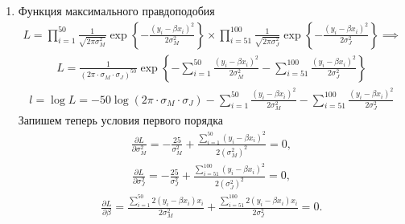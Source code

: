 \documentclass[12pt, a4paper]{article}\usepackage[]{graphicx}\usepackage[]{color}
\begin{document}
\begin{enumerate}
\item
Функция максимального правдоподобия
\begin{eqnarray}
L = \prod_{i=1}^{50} \frac 1 {\sqrt{2\pi \sigma_M^2}} \exp\left\{-\frac{(y_i - \beta x_i)^2}{2\sigma^2_M}\right\} \times \prod_{i=51}^{100} \frac 1 {\sqrt{2\pi \sigma_J^2}} \exp\left\{-\frac{(y_i - \beta x_i)^2}{2\sigma^2_J}\right\} \implies
\end{eqnarray}
\begin{eqnarray}
L = \frac{1}{(2\pi\cdot \sigma_M\cdot \sigma_J)^{50}} \exp\left\{-\sum_{i=1}^{50} \frac{(y_i - \beta x_i)^2}{2\sigma_M^2} - \sum_{i=51}^{100} \frac{(y_i - \beta x_i)^2}{2\sigma_J^2}\right\}
\end{eqnarray}
\begin{eqnarray}
l = \log L = -50 \log(2\pi \cdot \sigma_M \cdot \sigma_J) -\sum_{i=1}^{50} \frac{(y_i - \beta x_i)^2}{2\sigma_M^2} - \sum_{i=51}^{100} \frac{(y_i - \beta x_i)^2}{2\sigma_J^2}
\end{eqnarray}
Запишем теперь условия первого порядка
\begin{eqnarray}\label{m}
\frac {\partial L}{\partial \sigma_M^2} = -\frac{25}{\sigma_M^2} + \frac{\sum_{i=1}^{50} (y_i - \beta x_i)^2}{2(\sigma_M^2)^{2}} = 0,
\end{eqnarray}
\begin{eqnarray}\label{j}
\frac {\partial L}{\partial \sigma_J^2} = -\frac{25}{\sigma_J^2} + \frac{\sum_{i=51}^{100} (y_i - \beta x_i)^2}{2(\sigma_J^2)^{2}} = 0,
\end{eqnarray}
\begin{eqnarray}
\frac {\partial L}{\partial \beta} = \frac{\sum_{i=1}^{50} 2(y_i - \beta x_i) x_i} {2\sigma_M^2} + \frac{\sum_{i=51}^{100} 2(y_i - \beta x_i) x_i} {2\sigma_J^2} = 0.
\end{eqnarray}


\end{enumerate}
\end{document}
